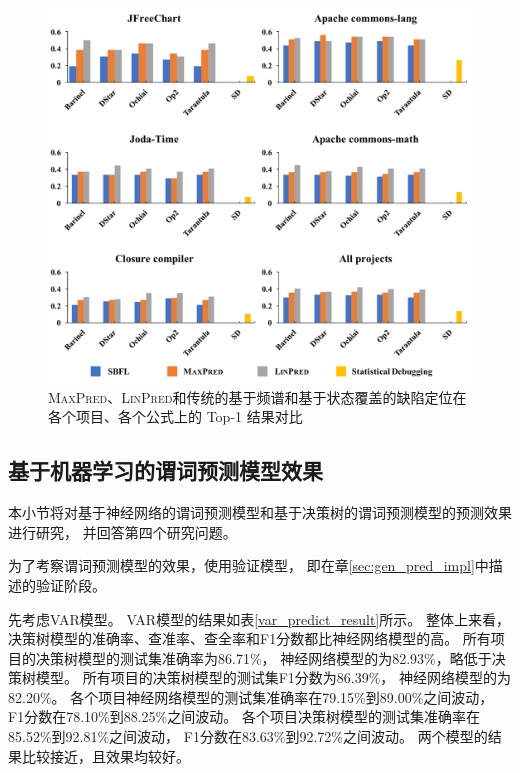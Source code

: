 \begin{figure}[htbp] 
\centering 
\includegraphics[width=15cm]{figure/all-figure-method-level} 
\caption{\textsc{MaxPred}、\textsc{LinPred}和传统的基于频谱和基于状态覆盖的缺陷定位在各个项目、各个公式上的 Top-1 结果对比} 
\label{fig:all-figure-method-level}
\end{figure}

\subsection{基于机器学习的谓词预测模型效果}

本小节将对基于神经网络的谓词预测模型和基于决策树的谓词预测模型的预测效果进行研究，
并回答第四个研究问题。

为了考察谓词预测模型的效果，使用验证模型，
即在章\ref{sec:gen_pred_impl}中描述的验证阶段。

先考虑VAR模型。
VAR模型的结果如表\ref{var_predict_result}所示。
整体上来看，决策树模型的准确率、查准率、查全率和F1分数都比神经网络模型的高。
所有项目的决策树模型的测试集准确率为86.71\%，
神经网络模型的为82.93\%，略低于决策树模型。
所有项目的决策树模型的测试集F1分数为86.39\%，
神经网络模型的为82.20\%。
各个项目神经网络模型的测试集准确率在79.15\%到89.00\%之间波动，
F1分数在78.10\%到88.25\%之间波动。
各个项目决策树模型的测试集准确率在85.52\%到92.81\%之间波动，
F1分数在83.63\%到92.72\%之间波动。
两个模型的结果比较接近，且效果均较好。

